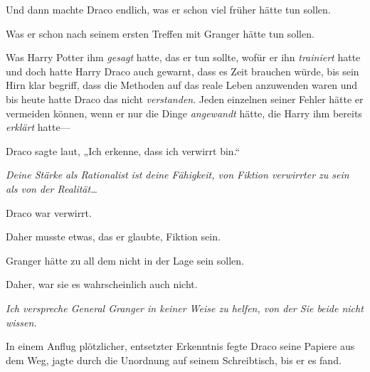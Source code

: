 Und dann machte Draco endlich, was er schon viel früher hätte tun sollen.

Was er schon nach seinem ersten Treffen mit Granger hätte tun sollen.

Was Harry Potter ihm \emph{gesagt} hatte, das er tun sollte, wofür er ihn \emph{trainiert} hatte und doch hatte Harry Draco auch gewarnt, dass es Zeit brauchen würde, bis sein Hirn klar begriff, dass die Methoden auf das reale Leben anzuwenden waren und bis heute hatte Draco das nicht \emph{verstanden}. Jeden einzelnen seiner Fehler hätte er vermeiden können, wenn er nur die Dinge \emph{angewandt} hätte, die Harry ihm bereits \emph{erklärt} hatte—

Draco sagte laut,
„Ich erkenne, dass ich verwirrt bin.“

\emph{Deine Stärke als Rationalist ist deine Fähigkeit, von Fiktion verwirrter zu sein als von der Realität…}

Draco war verwirrt.

Daher musste etwas, das er glaubte, Fiktion sein.

Granger hätte zu all dem nicht in der Lage sein sollen.

Daher, war sie es wahrscheinlich auch nicht.

\emph{Ich verspreche General Granger in keiner Weise zu helfen, von der Sie beide nicht wissen.}

In einem Anflug plötzlicher, entsetzter Erkenntnis fegte Draco seine Papiere aus dem Weg, jagte durch die Unordnung auf seinem Schreibtisch, bis er es fand.


